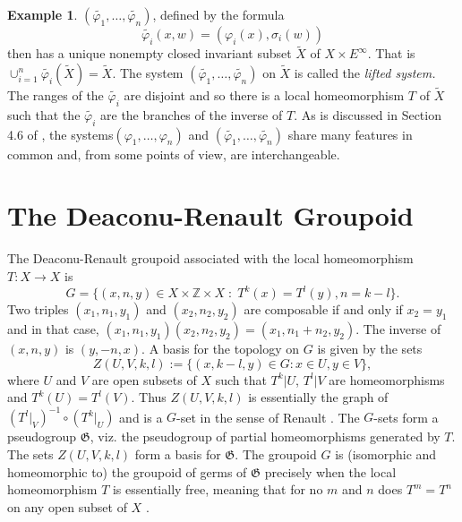 \documentclass{amsproc}
\theoremstyle{plain}
\theoremstyle{definition}
\newtheorem{example}[thm]{Example}
\theoremstyle{definition}
\theoremstyle{remark}
\theoremstyle{plain}
\begin{document}
\begin{example}
$(\tilde{\varphi_{1}},\dots,\tilde{\varphi_{n}})$,
defined by the formula\[
\tilde{\varphi_{i}}(x,w)=(\varphi_{i}(x),\sigma_{i}(w))\]
 then has a unique nonempty closed invariant subset $\tilde{X}$ of
$X\times E^{\infty}$. That is
$\cup_{i=1}^{n}\tilde{\varphi_{i}}(\tilde{X})=\tilde{X}$.
The system $(\tilde{\varphi_{1}},\dots,\tilde{\varphi_{n}})$ on $\tilde{X}$
is called the \emph{lifted system.} The ranges of the $\tilde{\varphi_{i}}$
are disjoint and so there is a local homeomorphism $T$ of $\tilde{X}$
such that the $\tilde{\varphi_{i}}$ are the branches of the inverse
of $T$. As is discussed in Section 4.6 of \cite{mB88}, the
systems$(\varphi_{1},\dots,\varphi_{n})$
and $(\tilde{\varphi_{1}},\dots,\tilde{\varphi_{n}})$ share many
features in common and, from some points of view, are interchangeable. 
\end{example}

\section{The Deaconu-Renault Groupoid}

The Deaconu-Renault groupoid associated with the local homeomorphism
$T:X\to X$ is\[
G=\{(x,n,y)\in X\times\mathbb{Z}\times X\;:\; T^{k}(x)=T^{l}(y),n=k-l\}.\]
Two triples $(x_{1},n_{1},y_{1})$ and $(x_{2},n_{2},y_{2})$ are
composable if and only if $x_{2}=y_{1}$ and in that case,
$(x_{1},n_{1},y_{1})(x_{2},n_{2},y_{2})=(x_{1},n_{1}+n_{2},y_{2})$.
The inverse of $(x,n,y)$ is $(y,-n,x)$. A basis for the topology
on $G$ is given by the sets\[
Z(U,V,k,l):=\{(x,k-l,y)\in G:x\in U,y\in V\},\]
where $U$ and $V$ are open subsets of $X$ such that $T^{k}|U$,
$T^{l}|V$ are homeomorphisms and $T^{k}(U)=T^{l}(V)$. Thus $Z(U,V,k,l)$
is essentially the graph of $(T^{l}|_{V})^{-1}\circ(T^{k}|_{U})$
and is a $G$-set in the sense of Renault \cite{jR80}. The $G$-sets
form a pseudogroup $\mathfrak{G}$, viz. the pseudogroup of partial
homeomorphisms generated by $T$. The sets $Z(U,V,k,l)$ form a basis
for $\mathfrak{G}$. The groupoid $G$ is (isomorphic and homeomorphic
to) the groupoid of germs of $\mathfrak{G}$ precisely when the local
homeomorphism $T$ is essentially free, meaning that for no $m$ and
$n$ does $T^{m}=T^{n}$ on any open subset of $X$ \cite[Proposition 2.8]{jR00}.
\end{document}
